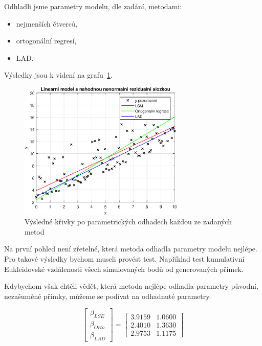 Odhladli jsme parametry modelu, dle zadání, metodami:

\begin{itemize}
    \item nejmenších čtverců,
    \item ortogonální regresí,
    \item LAD.
\end{itemize}

Výsledky jsou k videní na grafu~\ref{fig:lr1}.

\begin{figure}[htb]
    \centering
    \includegraphics[width=0.7\textwidth]{graphs/fig1.eps}
    \caption{Výsledné křivky po parametrických odhadech každou ze zadaných metod}
    \label{fig:lr1}
\end{figure}
\FloatBarrier

Na první pohled není zřetelné, která metoda odhadla parametry modelu nejlépe.
Pro takové výsledky bychom museli provést test.
Například test kumulativní Eukleidovské vzdálenosti všech simulovaných bodů od generovaných přímek.

Kdybychom však chtěli vědět, která metoda nejlépe odhadla parametry původní, nezašuměné přímky, můžeme se podívat na odhadnuté parametry.

\begin{equation*}
    \left[ \begin{matrix} \beta_{LSE} \\ \beta_{Orto} \\ \beta_{LAD} \end{matrix} \right] = \left[ \begin{matrix} 3.9159 & 1.0600 \\ 2.4010 & 1.3630 \\ 2.9753 & 1.1175 \end{matrix} \right]
\end{equation*}

